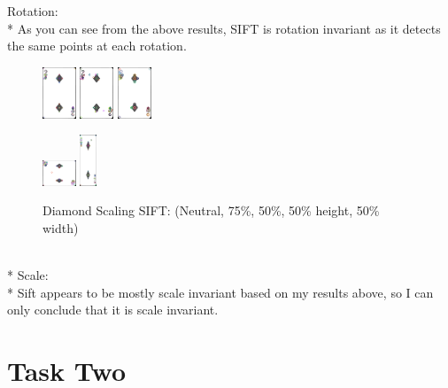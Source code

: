 \documentclass[conference]{IEEEtran}
\begin{document}
Rotation: \\*
As you can see from the above results, SIFT is rotation invariant as it detects the same points at each rotation.
\begin{figure}[htbp]
    \centerline{
        {\includegraphics[width=10mm, scale=0.5]{./figures/SIFT/diamondNeutral SIFT.png}}
        {\includegraphics[width=10mm, scale=0.5]{./figures/SIFT/diamond75 SIFT.png}}
        {\includegraphics[width=10mm, scale=0.5]{./figures/SIFT/diamond50 SIFT.png}}
    }
    \centerline{
        {\includegraphics[width=10mm, scale=0.5]{./figures/SIFT/diamondheightReduced SIFT.png}}
        {\includegraphics[width=5mm, scale=0.5]{./figures/SIFT/diamondwidthReduced SIFT.png}}
    }
    \caption{Diamond Scaling SIFT: (Neutral, 75\%, 50\%, 50\% height, 50\% width)}
    \label{fig}
\end{figure}
\\* Scale: \\*
Sift appears to be mostly scale invariant based on my results above, so I can only conclude that it is scale invariant.

\section{Task Two}
\end{document}
